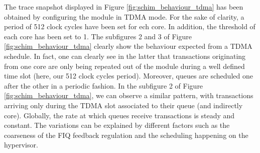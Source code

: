     The trace snapshot displayed in Figure \ref{fig:schim_behaviour_tdma} has been obtained by configuring the \schim module in TDMA mode. For the sake of clarity, a period of 512 clock cycles have been set for ech core. In addition, the threshold of each core has been set to 1.
    The subfigures 2 and 3 of Figure \ref{fig:schim_behaviour_tdma} clearly show the behaviour expected from a TDMA schedule. In fact, one can clearly see in the latter that transactions originating from one core are only being repeated out of the \schim module during a well defined time slot (here, our 512 clock cycles period). Moreover, queues are scheduled one after the other in a periodic fashion.
    In the subfigure 2 of Figure \ref{fig:schim_behaviour_tdma}, we can observe a similar pattern, with transactions arriving only during the TDMA slot associated to their queue (and indirectly core). Globally, the rate at which queues receive transactions is steady and constant. The variations can be explained by different factors such as the coarseness of the FIQ feedback regulation and the scheduling happening on the hypervisor.
    
